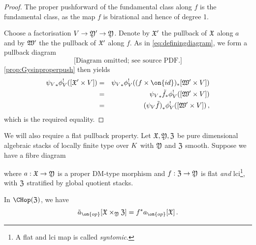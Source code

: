 \begin{proof}
The proper pushforward of the fundamental class along $f$ is the fundamental class, as the map $f$ is birational and hence of degree 1.

Choose a factorisation $V \to\frak Y' \to\frak Y$. Denote by $\frak X'$ the pullback of $\frak X$ along $a$ and by $\frak W'$ the the pullback of $\frak X'$ along $f$. As in \eqref{eq:definingdiagram}, we
form a pullback diagram
\begin{equation}
 \text{[Diagram omitted; see source PDF.]}
\end{equation}
 \cref{prop:Gysinproperpush} then yields
\begin{eqnarray*}
{\psi_V}_* \phi_V^!([\frak X' \times V]) &=&  {\psi_V}_* \phi_V^!((f \times \on{id})_*[\frak W' \times V])\\
&=& {\psi_V}_* \tilde{f}_* \phi_V^! ([\frak W' \times V])\\
&= &{(\psi_V \tilde{f})}_* \phi_V^! ([\frak W' \times V])\, ,
\end{eqnarray*}
which is the required equality.
\end{proof}

We will also require a flat pullback property.
Let $\frak X, \frak Y, \frak Z$ be pure dimensional algebraic stacks of locally finite type over ${K}$  with $\frak Y$ and $\frak Z$ smooth.
Suppose we have a fibre diagram


where  $a: \frak X \to \frak Y$ is a proper DM-type morphism and $f: \frak Z \to \frak Y$ is flat {\em and} lci\footnote{A flat and lci map is called {\em syntomic}.}, with $\frak Z$ stratified by global quotient stacks.
\begin{lemma}
\notready\label{lem:pushpullcommutes}
In $\CHop(\frak Z)$, we have
$$\tilde{a}_{\on{op}} [\frak X \times_{\frak Y} \frak Z] = f^* a_{\on{op}}[\frak X]\, .$$
\end{lemma}

